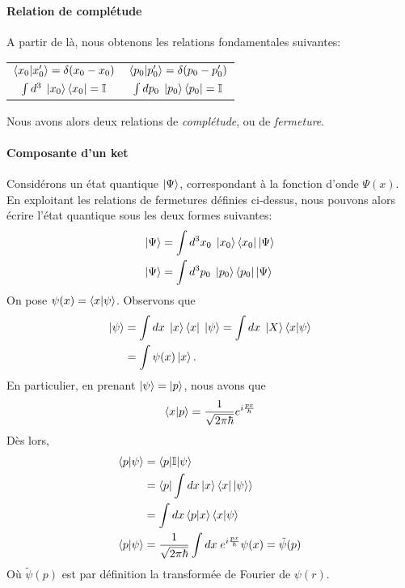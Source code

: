 \documentclass[../notesdecours.tex]{subfiles}
\begin{document}
\paragraph{Relation de complétude} \label{complétude}
A partir de là, nous obtenons les relations fondamentales suivantes:
\begin{center}
\begin{tabular}{c|c}
$\braket{x_0|x_0'} = \delta (x_0 - x_0)$ & $\braket{p_0|p_0'} = \delta (p_0-p_0')$\\
$\int d^3 \; \ket{x_0}\bra{x_0} = \mathbb{I}$ & $\int dp_0 \; \ket{p_0}\bra{p_0} = \mathbb{I}$
\end{tabular}
\end{center}
Nous avons alors deux relations de \emph{complétude}, ou de \emph{fermeture}.

\paragraph{Composante d'un ket}
Considérons un état quantique $\ket{\Psi}$, correspondant à la fonction d'onde $\Psi(x)$. En exploitant les relations de fermetures définies ci-dessus, nous pouvons alors écrire l'état quantique sous les deux formes suivantes:
\begin{align}
\ket{\Psi} &= \int d^3x_0 \; \ket{x_0} \bra{x_0} \ket{\Psi}\\
\ket{\Psi} &= \int d^3p_0 \; \ket{p_0} \bra{p_0} \ket{\Psi}
\end{align}
On pose $\psi(x) = \braket{x|\psi}$. Observons que
\begin{align}
\ket{\psi} &= \int dx \; \ket{x}\bra{x} \; \ket{\psi} = \int dx \; \ket{X} \braket{x|\psi}\\
&= \int \psi(x)\ket{x}.
\end{align}
En particulier, en prenant $\ket{\psi} = \ket{p}$, nous avons que
\begin{equation}
\braket{x|p} = \frac{1}{\sqrt{2\pi\hbar}}e^{i \frac{px}{\hbar}}
\end{equation}
Dès lors, 
\begin{align}
\braket{p|\psi} &= \braket{p|\mathbb{I}|\psi}\notag\\
&= \braket{p|\int dx \ket{x}\bra{x} \ket{\psi}}\notag\\
&= \int dx \braket{p|x}\braket{x|\psi}\notag\\
\braket{p|\psi} &= \frac{1}{\sqrt{2\pi\hbar}}\int dx \; e^{i \frac{px}{\hbar}}\psi(x) = \tilde{\psi}(p)
\end{align}
Où $\tilde{\psi}(p)$ est par définition la transformée de Fourier de $\psi(r)$.\\
\end{document}
